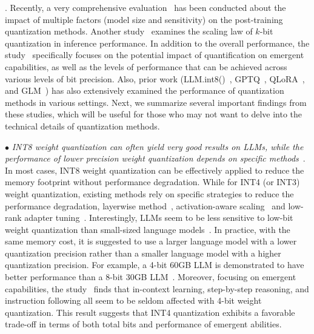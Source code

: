 . Recently, a very comprehensive evaluation~\cite{Yao-CoRR-2023-ZeroQuant-V2}  has been conducted about the impact of multiple factors (\eg model size and sensitivity) on the post-training quantization methods. Another  study~\cite{Dettmers-2022-arxiv-case} examines the scaling law of $k$-bit quantization in inference performance.   
{In addition to  the overall performance, the study~\cite{Liu-2023-arxiv-Do_emergent} specifically focuses on the potential impact of quantification on emergent capabilities, as well as the levels of performance that can be achieved across various levels of bit precision.}
Also,  prior  work (\eg LLM.int8()~\cite{Dettmers-CoRR-2022-LLM.int8}, GPTQ~\cite{frantar-arxiv-2022-gptq}, QLoRA~\cite{Dettmers-CoRR-2023-QLoRA}, and GLM~\cite{Zeng-arxiv-2022-GLM}) has also extensively examined the performance of quantization methods in various settings. Next, we summarize several important findings from these studies, which will be useful for those who may not want to delve into the technical details of quantization methods. 

$\bullet$ \emph{INT8 weight quantization can often yield very good results on LLMs, while the performance of lower precision weight quantization depends on specific  methods}~\cite{Yao-CoRR-2023-ZeroQuant-V2,Xiao-CoRR-2022-SmoothQuant,frantar-arxiv-2022-gptq,Lin-arXiv-2023-AWQ}.  In most cases, INT8 weight quantization can be effectively applied to reduce the memory footprint without performance degradation. 
While for INT4 (or INT3) weight quantization, existing methods rely on specific strategies to reduce the performance degradation, \eg layerwise method~\cite{frantar-arxiv-2022-gptq,Yao-NeurlPS-2022-ZeroQuant}, activation-aware scaling~\cite{Lin-arXiv-2023-AWQ} and low-rank adapter tuning~\cite{Dettmers-CoRR-2023-QLoRA}. Interestingly, LLMs seem to be less sensitive to low-bit weight quantization than small-sized language models~\cite{Yao-CoRR-2023-ZeroQuant-V2}.
In practice, with the same memory cost, it is suggested to use a larger language model with a lower quantization precision rather than a smaller language model with a higher quantization precision. For example, a 4-bit 60GB LLM is demonstrated to have better performance than a 8-bit 30GB LLM~\cite{Dettmers-2022-arxiv-case}. 
{Moreover, focusing on emergent capabilities, the study~\cite{Liu-2023-arxiv-Do_emergent} finds that in-context learning, step-by-step reasoning, and instruction following all seem to be seldom affected with 4-bit weight quantization. This result suggests that INT4 quantization exhibits a favorable trade-off in terms of both total bits and performance of emergent abilities.}


